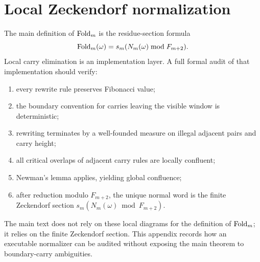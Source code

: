 \section{Local Zeckendorf normalization}
\label{app:rewriting}

The main definition of \(\operatorname{Fold}_m\) is the residue-section formula
\[
\operatorname{Fold}_m(\omega)=s_m(N_m(\omega)\bmod F_{m+2}).
\]
Local carry elimination is an implementation layer.  A full formal audit of that implementation should verify:
\begin{enumerate}[label=(A\arabic*)]
\item every rewrite rule preserves Fibonacci value;
\item the boundary convention for carries leaving the visible window is deterministic;
\item rewriting terminates by a well-founded measure on illegal adjacent pairs and carry height;
\item all critical overlaps of adjacent carry rules are locally confluent;
\item Newman's lemma applies, yielding global confluence;
\item after reduction modulo \(F_{m+2}\), the unique normal word is the finite Zeckendorf section \(s_m(N_m(\omega)\bmod F_{m+2})\).
\end{enumerate}

The main text does not rely on these local diagrams for the definition of \(\operatorname{Fold}_m\); it relies on the finite Zeckendorf section.  This appendix records how an executable normalizer can be audited without exposing the main theorem to boundary-carry ambiguities.
